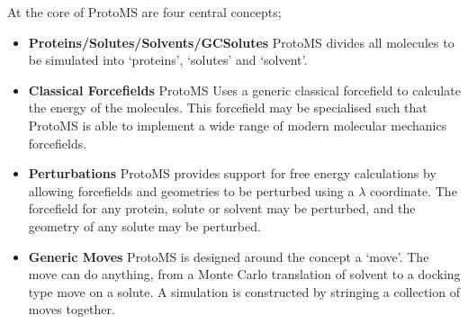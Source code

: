 \documentclass[letterpaper,10pt,english]{sphinxmanual}
\begin{document}
At the core of ProtoMS are four central concepts;
\begin{itemize}
\item {} 
\textbf{Proteins/Solutes/Solvents/GCSolutes} ProtoMS divides all molecules to be simulated into ‘proteins’, ‘solutes’ and ‘solvent’.

\item {} 
\textbf{Classical Forcefields} ProtoMS Uses a generic classical forcefield to calculate the energy of the molecules. This forcefield may be specialised such that ProtoMS is able to implement a wide range of modern molecular mechanics forcefields.

\item {} 
\textbf{Perturbations} ProtoMS provides support for free energy calculations by allowing forcefields and geometries to be perturbed using a \(\lambda\) coordinate. The forcefield for any protein, solute or solvent may be perturbed, and the geometry of any solute may be perturbed.

\item {} 
\textbf{Generic Moves} ProtoMS is designed around the concept a ‘move’. The move can do anything, from a Monte Carlo translation of solvent to a docking type move on a solute. A simulation is constructed by stringing a collection of moves together.

\end{itemize}
\end{document}
